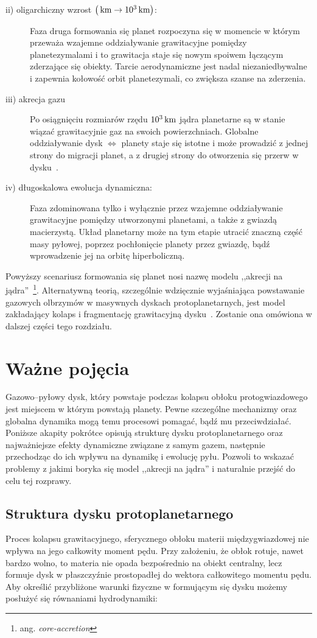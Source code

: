 \begin{description}
\item[ii) oligarchiczny wzrost $\left(\hbox{$\thinspace\textrm{km}$} \rightarrow
   10^3\hbox{$\thinspace\textrm{km}$}\right)$:]
   Faza druga formowania się planet rozpoczyna się w momencie w którym przeważa
   wzajemne oddziaływanie grawitacyjne pomiędzy planetezymalami i to grawitacja
   staje się nowym spoiwem łączącym zderzające się obiekty. Tarcie
   aerodynamiczne jest nadal niezaniedbywalne i zapewnia kołowość orbit
   planetezymali, co zwiększa szanse na zderzenia.
\item[iii) akrecja gazu]
   Po osiągnięciu rozmiarów rzędu $10^3\hbox{$\thinspace\textrm{km}$}$ jądra planetarne
   są w stanie wiązać grawitacyjnie gaz na swoich powierzchniach. Globalne
   oddziaływanie dysk $\iff$ planety staje się istotne i może prowadzić z jednej
   strony do migracji planet, a z drugiej strony do otworzenia się przerw w
   dysku~\citep{KKI06}.
\item[iv) długoskalowa ewolucja dynamiczna:]
   Faza zdominowana tylko i wyłącznie przez wzajemne oddziaływanie grawitacyjne
   pomiędzy utworzonymi planetami, a także z gwiazdą macierzystą. Układ
   planetarny może na tym etapie utracić znaczną część masy pyłowej, poprzez
   pochłonięcie planety przez gwiazdę, bądź wprowadzenie jej na orbitę
   hiperboliczną.
\end{description}
Powyższy scenariusz formowania się planet nosi nazwę modelu ,,akrecji na
jądra''~\footnote{ang. \emph{core-accretion}}. Alternatywną teorią, szczególnie
wdzięcznie wyjaśniająca powstawanie gazowych olbrzymów w masywnych dyskach
protoplanetarnych, jest model zakładający kolaps i fragmentację grawitacyjną
dysku~\cite{Boss}. Zostanie ona omówiona w dalszej części tego rozdziału.

\section{Ważne pojęcia}
Gazowo--pyłowy dysk, który powstaje podczas kolapsu obłoku protogwiazdowego jest
miejscem w którym powstają planety. Pewne szczególne mechanizmy oraz globalna
dynamika mogą temu procesowi pomagać, bądź mu przeciwdziałać. Poniższe akapity
pokrótce opisują strukturę dysku protoplanetarnego oraz najważniejsze efekty
dynamiczne związane z samym gazem, następnie przechodząc do ich wpływu na
dynamikę i ewolucję pyłu. Pozwoli to wskazać problemy z jakimi boryka się model
,,akrecji na jądra'' i naturalnie przejść do celu tej rozprawy.

\subsection{Struktura dysku protoplanetarnego}
Proces kolapsu grawitacyjnego, sferycznego obłoku materii międzygwiazdowej nie
wpływa na jego całkowity moment pędu. Przy założeniu, że obłok rotuje, nawet
bardzo wolno, to materia nie opada bezpośrednio na obiekt
centralny, lecz formuje dysk w płaszczyźnie prostopadłej do wektora całkowitego
momentu pędu. Aby określić przybliżone warunki fizyczne w formującym się dysku
możemy posłużyć się równaniami hydrodynamiki:

